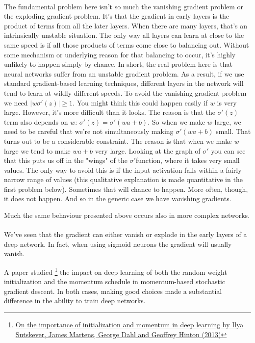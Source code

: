 {\paragraph{} The fundamental problem here isn't so much the vanishing gradient problem or the exploding gradient problem. It's that the gradient in early layers is the product of terms from all the later layers. When there are many layers, that's an intrinsically unstable situation. The only way all layers can learn at close to the same speed is if all those products of terms come close to balancing out. Without some mechanism or underlying reason for that balancing to occur, it's highly unlikely to happen simply by chance. In short, the real problem here is that neural networks suffer from an unstable gradient problem. As a result, if we use standard gradient-based learning techniques, different layers in the network will tend to learn at wildly different speeds. To avoid the vanishing gradient problem we need $|w\sigma'(z)|\ge 1$. You might think this could happen easily if $w$ is very large. However, it's more difficult than it looks. The reason is that the $\sigma'(z)$ term also depends on $w$: $\sigma'(z)=\sigma'(wa+b)$. So when we make $w$ large, we need to be careful that we're not simultaneously making $\sigma'(wa+b)$ small. That turns out to be a considerable constraint. The reason is that when we make $w$ large we tend to make $wa+b$ very large. Looking at the graph of $\sigma'$ you can see that this puts us off in the "wings" of the $\sigma'$function, where it takes very small values. The only way to avoid this is if the input activation falls within a fairly narrow range of values (this qualitative explanation is made quantitative in the first problem below). Sometimes that will chance to happen. More often, though, it does not happen. And so in the generic case we have vanishing gradients.

Much the same behaviour presented above occurs also in more complex networks. 

\paragraph{} We've seen that the gradient can either vanish or explode in the early layers of a deep network. In fact, when using sigmoid neurons the gradient will usually vanish. 

A paper studied \footnote{\href{http://www.cs.toronto.edu/~hinton/absps/momentum.pdf}{On the importance of initialization and momentum in deep learning by Ilya Sutskever, James Martens, George Dahl and Geoffrey Hinton (2013)}} the impact on deep learning of both the random weight initialization and the momentum schedule in momentum-based stochastic gradient descent. In both cases, making good choices made a substantial difference in the ability to train deep networks.

}
